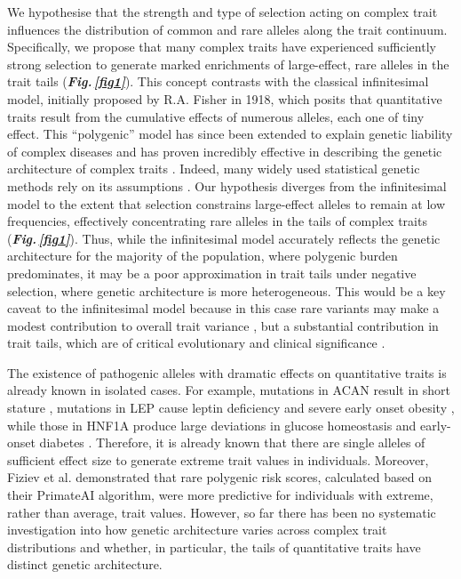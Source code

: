 \documentclass[12pt]{zHenriquesLab-StyleBioRxiv}
\newcommand\fref[1]{\normalsize{\textbf{\textit{Fig.\,\ref{#1}}}}\normalsize{}}
\begin{document}
We hypothesise that the strength and type of selection acting on complex trait influences 
the distribution of common and rare alleles along the trait continuum. Specifically, we 
propose that many complex traits have experienced sufficiently strong selection to generate 
marked enrichments of large-effect, rare alleles in the trait tails (\fref{fig1}). 
This concept contrasts with the classical infinitesimal model, initially 
proposed \cite{Fisher1919} by R.A. Fisher in 1918, which posits that quantitative traits result 
from the cumulative effects of numerous alleles, each one of tiny effect. This “polygenic” model has 
since been extended to explain genetic liability of complex diseases and has proven incredibly 
effective in describing the genetic architecture of complex traits \cite{Barton2017}. 
Indeed, many widely used statistical genetic methods rely on its 
assumptions \cite{Yang2011, BulikSullivan2015, Choi2020}. Our hypothesis diverges 
from the infinitesimal model to the extent that selection constrains large-effect alleles 
to remain at low frequencies, effectively concentrating rare alleles in the tails of complex traits (\fref{fig1}). 
Thus, while the infinitesimal model accurately reflects the genetic architecture for the 
majority of the population, where polygenic burden predominates, it may be a poor approximation 
in trait tails under negative selection, where genetic architecture is more heterogeneous. 
This would be a key caveat to the infinitesimal model because in this case rare variants may 
make a modest contribution to overall trait variance \cite{Pathan2024}, but a substantial 
contribution in trait tails, which are of critical evolutionary and clinical 
significance \cite{Kingsolver2007, Ference2018, Kyrou2000}. 



The existence of pathogenic alleles with dramatic effects on quantitative 
traits is already known in isolated cases. For example, mutations in ACAN 
result in short stature \cite{vanDerSteen2017}, mutations in LEP cause leptin 
deficiency and severe early onset obesity \cite{Saeed2015}, while those in HNF1A 
produce large deviations in glucose homeostasis and early-onset diabetes \cite{Miyachi2022}. 
Therefore, it is already known that there are single alleles of sufficient effect size 
to generate extreme trait values in individuals. Moreover, Fiziev et al. \cite{Fiziev2023} 
demonstrated that rare polygenic risk scores, calculated based on their PrimateAI algorithm, 
were more predictive for individuals with extreme, rather than average, trait values. 
However, so far there has been no systematic investigation into how genetic architecture varies 
across complex trait distributions and whether, in particular, the tails of quantitative traits have distinct genetic architecture. 
\end{document}
